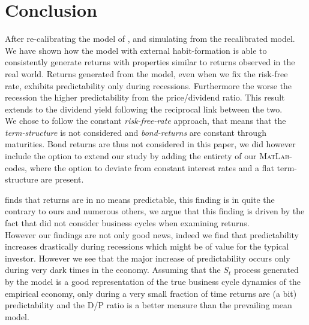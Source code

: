 \clearpage
\section{Conclusion} \label{sec:Conclusion}
After re-calibrating the model of \citet{Campbell1999}, and simulating from the recalibrated model. We have shown how the model with external habit-formation is able to consistently generate returns with properties similar to returns observed in the real world. Returns generated from the model, even when we fix the risk-free rate, exhibits predictability only during recessions. Furthermore the worse the recession the higher predictability from the price/dividend ratio. This result extends to the dividend yield following the reciprocal link between the two. \\

We chose to follow the constant \textit{risk-free-rate} approach, that means that the \textit{term-structure} is not considered and \textit{bond-returns} are constant through maturities. Bond returns are thus not considered in this paper, we did however include the option to extend our study by adding the entirety of our \textsc{MatLab}-codes, where the option to deviate from constant interest rates and a flat term-structure are present.

\citet{Goyal2004} finds that returns are in no means predictable, this finding is in quite the contrary to ours and numerous others, we argue that this finding is driven by the fact that \citet{Goyal2004} did not consider business cycles when examining returns.\\

However our findings are not only good news, indeed we find that predictability increases drastically  during recessions which might be of value for the typical investor. However we see that the  major increase of predictability occurs only during very dark times in the economy. Assuming that the $S_t$ process generated by the model is a good representation of the true business cycle dynamics of the empirical economy, only during a very small fraction of time returns are (a bit) predictability and the D/P ratio is a better measure than the prevailing mean model.



